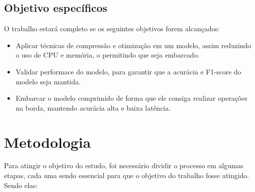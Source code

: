 \subsection{Objetivo específicos}
O trabalho estará completo se os seguintes objetivos forem alcançados:

\begin{itemize}
	\item Aplicar técnicas de compressão e otimização em um modelo, assim reduzindo o uso de CPU e memória,
		o permitindo que seja embarcado.
	\item Validar performace do modelo, para garantir que a acurácia e F1-score do modelo seja mantida.
	\item Embarcar o modelo comprimido de forma que ele consiga realizar operações na borda, mantendo acurácia
		alta e baixa latência.
\end{itemize}

\section{Metodologia}
Para atingir o objetivo do estudo, foi necessário dividir o processo em algumas etapas, cada uma sendo
essencial para que o objetivo do trabalho fosse atingido. Sendo elas:

